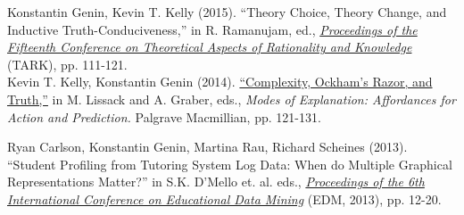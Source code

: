 \documentclass[12pt]{res} %
\begin{document}
\begin{resume}
Konstantin Genin, Kevin T. Kelly (2015). {``Theory Choice, Theory Change, and Inductive Truth-Conduciveness,''} in R. Ramanujam, ed., \href{https://www.imsc.res.in/tark/TARK2015-proceedings.pdf}{{\em Proceedings of the Fifteenth Conference on Theoretical Aspects of Rationality and Knowledge}} (TARK), pp. 111-121.\\ 

Kevin T. Kelly, Konstantin Genin (2014). \href{http://dx.doi.org/10.1057/9781137403865_9}{``Complexity, Ockham's Razor, and Truth,''} in M. Lissack and A. Graber, eds.,  {\em Modes of Explanation: Affordances for Action and Prediction.} Palgrave Macmillian, pp. 121-131.

Ryan Carlson, Konstantin Genin, Martina Rau, Richard Scheines (2013). ``Student Profiling from Tutoring System Log Data: When do Multiple Graphical Representations Matter?'' in S.K. D'Mello et. al. eds., \href{http://www.educationaldatamining.org/EDM2013/proceedings/EDM2013Proceedings.pdf}{\em Proceedings of the 6th International Conference on Educational Data Mining} (EDM, 2013), pp. 12-20.

\end{resume} 
\end{document}
